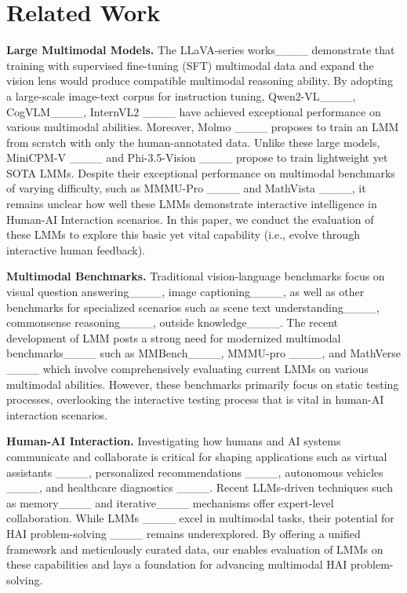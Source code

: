 \section{Related Work}
\textbf{Large Multimodal Models.}
The LLaVA-series works____ demonstrate that training with supervised fine-tuning (SFT) multimodal data and expand the vision lens would produce compatible multimodal reasoning ability. By adopting a large-scale image-text corpus for instruction tuning, Qwen2-VL____, CogVLM____, InternVL2 ____ have achieved exceptional performance on various multimodal abilities. Moreover, Molmo ____ proposes to train an LMM from scratch with only the human-annotated data. Unlike these large models, MiniCPM-V ____ and Phi-3.5-Vision ____ propose to train lightweight yet SOTA LMMs. Despite their exceptional performance on multimodal benchmarks of varying difficulty, such as MMMU-Pro ____ and MathVista ____, it remains unclear how well these LMMs demonstrate interactive intelligence in Human-AI Interaction scenarios. In this paper, we conduct the evaluation of these LMMs to explore this basic yet vital capability (i.e., evolve through interactive human feedback).

\textbf{Multimodal Benchmarks.}
Traditional vision-language benchmarks focus on visual question answering____, image captioning____, as well as other benchmarks for specialized scenarios such as scene text understanding____, commonsense reasoning____, outside knowledge____. The recent development of LMM posts a strong need for modernized multimodal benchmarks____ such as MMBench____, MMMU-pro ____, and MathVerse ____ which involve comprehensively evaluating current LMMs on various multimodal abilities. However, these benchmarks primarily focus on static testing processes, overlooking the interactive testing process that is vital in human-AI interaction scenarios.

\textbf{Human-AI Interaction.}
Investigating how humans and AI systems communicate and collaborate is critical for shaping applications such as virtual assistants ____, personalized recommendations ____, autonomous vehicles ____, and healthcare diagnostics ____. Recent LLMs-driven techniques such as memory____ and iterative____ mechanisms offer expert-level collaboration. While LMMs ____ excel in multimodal tasks, their potential for HAI problem-solving ____ remains underexplored. By offering a unified framework and meticulously curated data, our \bench{} enables evaluation of LMMs on these capabilities and lays a foundation for advancing multimodal HAI problem-solving.

